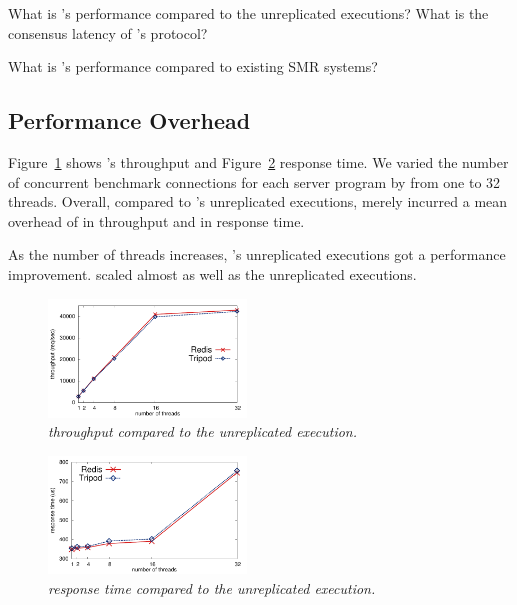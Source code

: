 \begin{tightenum}

\item[\S\ref{sec:overhead}:] What is \xxx's performance compared to the 
unreplicated executions? What is the consensus latency of \xxx's \paxos 
protocol?

\item[\S\ref{sec:compare}:] What is \xxx's performance compared to existing 
SMR systems?



\end{tightenum}

\subsection{Performance Overhead} \label{sec:overhead}

Figure~\ref{fig:tput} shows \xxx's throughput and 
Figure~\ref{fig:latency} response time. We varied the number of concurrent 
benchmark connections for each server program by from one to 32 threads. 
Overall, compared to \redis's unreplicated executions, \xxx merely incurred a 
mean overhead of \tputoverhead in throughput and \latencyoverhead in response 
time.

As the number of threads increases, \redis's unreplicated executions 
got a performance improvement. \xxx scaled almost as well as the unreplicated 
executions.

\begin{figure}[h]
\centering
\includegraphics[width=0.47\textwidth]{figures/throughput}
\caption{\small {\em \xxx throughput compared to the unreplicated 
execution.}}
\label{fig:tput}
\end{figure}
 
\begin{figure}[h]
\centering
\includegraphics[width=0.47\textwidth]{figures/latency}
\caption{\small {\em \xxx response time compared to the unreplicated 
execution.}}
\label{fig:latency}
\end{figure}


